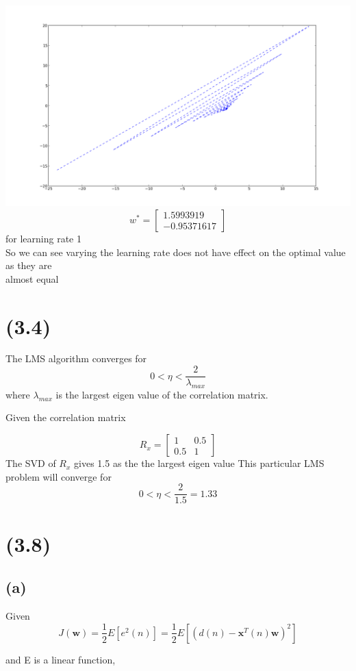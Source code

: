 \documentclass[paper=a4, fontsize=11pt]{scrartcl} %
\begin{document}
\includegraphics[scale=0.4]{LearningRate1.png}
\[ w^{*} = \begin{bmatrix} 1.5993919 \\ -0.95371617 \end{bmatrix}\]
for learning rate 1 \\

So we can see varying the learning rate does not have effect on the optimal value as they are \\
almost equal

\section{ (3.4) }
The LMS algorithm converges for 
$$0 < \eta < \frac{2}{\lambda_{max}} $$ 
where $\lambda_{max}$ is the largest eigen value of the correlation matrix.

Given the correlation matrix

$$
R_x =  
\left[ 
\begin{array}{cc}
1 & 0.5 \\ 
0.5 & 1 
\end{array} 
\right]
$$
The SVD of $R_x$ gives 1.5 as the the largest eigen value
This particular LMS problem will converge for 
$$ 0 < \eta <  \frac{2}{1.5} = 1.33 $$
\section{ (3.8) }
\subsection{ (a) }
Given 
$$ J(\pmb{w}) = \frac{1}{2}E[e^2(n)] = \frac{1}{2}E\left[(d(n)-\pmb{x}^T(n)\pmb{w})^2\right]$$

and E is a linear function,
\end{document}
